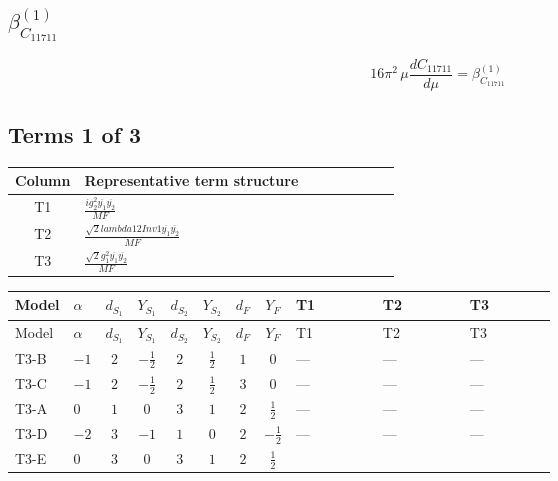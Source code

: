 \documentclass[8pt]{article}
\begin{document}
\begin{landscape}
\section*{$\beta_{C_{11711}}^{(1)}$}
\[16\pi^2\,\mu\frac{d C_{11711}}{d\mu}=\beta_{C_{11711}}^{(1)}\]
\subsection*{Terms 1 of 3}
\begin{center}
\begin{tabular}{@{}c >{\raggedright\arraybackslash}p{0.82\linewidth}@{}}
\toprule
Column & Representative term structure \\
\midrule
T1 & \(\displaystyle \frac{i g_{2}^{2} \overline{y_{1}} \overline{y_{2}}}{MF}\) \\
\midrule
T2 & \(\displaystyle \frac{\sqrt{2} lambda12Inv1 \overline{y_{1}} \overline{y_{2}}}{MF}\) \\
\midrule
T3 & \(\displaystyle \frac{\sqrt{2} g_{1}^{2} \overline{y_{1}} \overline{y_{2}}}{MF}\) \\
\midrule
\bottomrule
\end{tabular}
\end{center}
\smallskip
\tiny
\begin{longtable}{@{}llcccccc >{\raggedright\arraybackslash}p{0.21\linewidth} >{\raggedright\arraybackslash}p{0.21\linewidth} >{\raggedright\arraybackslash}p{0.21\linewidth}@{}}
\toprule
Model & $\alpha$ & $d_{S_1}$ & $Y_{S_1}$ & $d_{S_2}$ & $Y_{S_2}$ & $d_F$ & $Y_F$ & T1 & T2 & T3 \\
\midrule
\endfirsthead
\toprule
Model & $\alpha$ & $d_{S_1}$ & $Y_{S_1}$ & $d_{S_2}$ & $Y_{S_2}$ & $d_F$ & $Y_F$ & T1 & T2 & T3 \\
\midrule
\endhead
T3-B & $-1$ & $2$ & $-\frac{1}{2}$ & $2$ & $\frac{1}{2}$ & $1$ & $0$ & --- & --- & --- \\
\midrule
T3-C & $-1$ & $2$ & $-\frac{1}{2}$ & $2$ & $\frac{1}{2}$ & $3$ & $0$ & --- & --- & --- \\
\midrule
T3-A & $0$ & $1$ & $0$ & $3$ & $1$ & $2$ & $\frac{1}{2}$ & --- & --- & --- \\
\midrule
T3-D & $-2$ & $3$ & $-1$ & $1$ & $0$ & $2$ & $-\frac{1}{2}$ & --- & --- & --- \\
\midrule
T3-E & $0$ & $3$ & $0$ & $3$ & $1$ & $2$ & $\frac{1}{2}$ & \scriptsize\adjustbox{max width=\linewidth}{$\begin{gathered} \frac{i g_{2}^{2} \overline{y_{1}} \overline{y_{2}}}{MF}\end{gathered}$} & \scriptsize\adjustbox{max width=\linewidth}{$\begin{gathered} - \frac{\sqrt{2} lambda12Inv1 \overline{y_{1}} \overline{y_{2}}}{4 MF}\end{gathered}$} & \scriptsize\adjustbox{max width=\linewidth}{$\begin{gathered} \frac{3 \sqrt{2} g_{1}^{2} \overline{y_{1}} \overline{y_{2}}}{16 MF}\end{gathered}$} \\
\midrule
\bottomrule
\end{longtable}
\clearpage

\end{landscape}
\end{document}

